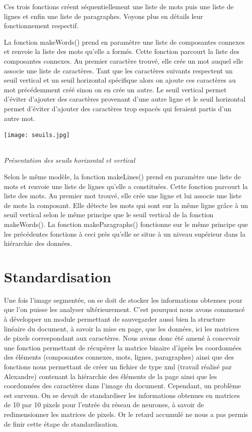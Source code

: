 \documentclass[a4paper,12pt]{report}
\begin{document}
Ces trois fonctions créent séquentiellement une liste de mots puis une liste de lignes et
enfin une liste de paragraphes. Voyons plus en détails leur fonctionnement respectif.
   
La fonction makeWords() prend en paramètre une liste de composantes connexes et
renvoie la liste des mots qu'elle a formés. Cette fonction parcourt la liste des composantes
connexes. Au premier caractère trouvé, elle crée un mot auquel elle associe une liste de
caractères. Tant que les caractères suivants respectent un seuil vertical et un seuil
horizontal spécifique alors on ajoute ces caractères au mot précédemment créé sinon on en
crée un autre. Le seuil vertical permet d'éviter d'ajouter des caractères provenant d'une
autre ligne et le seuil horizontal permet d'éviter d'ajouter des caractères trop espacés qui
feraient partis d'un autre mot.

\begin{center}
  \texttt{[image: seuils.jpg]}
  \caption{\\\emph{Pr\'esentation des seuils horizontal et vertical}}
\end{center}

Selon le même modèle, la fonction makeLines() prend en paramètre une liste de mots et
renvoie une liste de lignes qu'elle a constituées. Cette fonction parcourt la liste des mots. Au
premier mot trouvé, elle crée une ligne et lui associe une liste de mots la composant. Elle
détecte les mots qui sont sur la même ligne grâce à un seuil vertical selon le même principe
que le seuil vertical de la fonction makeWords(). La fonction makeParagraphs() fonctionne
sur le même principe que les précédentes fonctions à ceci près qu'elle se situe à un niveau
supérieur dans la hiérarchie des données.



\section{Standardisation}

Une fois l'image segment\'ee, on se doit de stocker les informations obtenues pour que l'on puisse
les analyser ult\'erieurement. C'est pourquoi nous avons commenc\'e \`a d\'evelopper un module
permettant de sauvegarder aussi bien la structure lin\'eaire du document, \`a savoir la mise en page,
que les donn\'ees, ici les matrices de pixels correspondant aux caract\`eres. Nous avons donc \'et\'e
amen\'e \`a concevoir une fonction permettant de r\'ecup\'erer la matrice binaire d'\`apr\`es les coordonn\'ees
des \'el\'ements (composantes connexes, mots, lignes, paragraphes) ainsi que des fonctions nous permettant de
cr\'eer un fichier de type xml (travail r\'ealis\'e par Alexandre) contenant la hi\'erarchie des \'el\'ements
de la page ainsi que les coordonn\'ees des caract\`eres dans l'image du document. Cependant, un probl\`eme est
survenu. On se devait de standardiser les informations obtenues en matrices de 10 par 10 pixels pour l'entr\'ee
du r\'eseau de neurones, \`a savoir de redimensionner les matrices de pixels.
Or le retard accumul\'e ne nous a pas permis de finir cette \'etape de standardisation.
\end{document}
